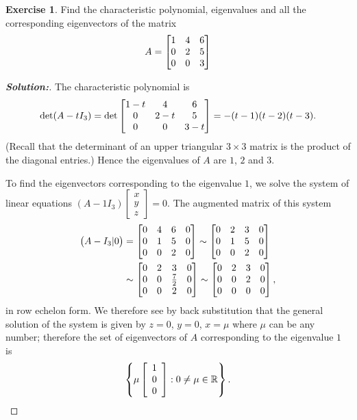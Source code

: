 \documentclass[a4paper]{amsart}
\theoremstyle{definition}
\newtheorem{exercise}{Exercise}
\newenvironment{solution}{\begin{proof}[\textbf{Solution:}] \vphantom{u}}{\end{proof}}
\begin{document}
\begin{exercise}\label{ex-evectors-i}
 Find the characteristic polynomial, eigenvalues and all the corresponding
 eigenvectors of the matrix
 \[ A = \left[\begin{matrix} 1 & 4 & 6 \\ 0 & 2 & 5 \\ 0 & 0 & 3 \end{matrix}\right] \]
\end{exercise}
\begin{solution}
 The characteristic polynomial is
    $$ \det (A - tI_3) =
    \det \left[\begin{matrix}
    1-t & 4 & 6 \\
    0 & 2-t & 5 \\
    0 & 0 & 3-t
    \end{matrix}\right]=-(t-1)(t-2)(t-3).
    $$
 (Recall that the determinant of an upper triangular $3 \times 3$
 matrix is the product of the diagonal entries.) Hence the
 eigenvalues of $A$ are $1$, $2$ and $3$.

 To find the eigenvectors corresponding to the eigenvalue $1$, we
 solve the system of linear equations $(A - 1I_3)\left[
 \begin{array}{c}x \\ y\\z
 \end{array} \right] = 0$. The augmented matrix of this system
 \begin{align*}
 \big(A - I_3|0\big) & = \left[\begin{matrix} 0& 4&
 6&0\\0&1&5&0\\0&0&2&0\end{matrix}\right] \sim \left[\begin{matrix} 0& 2&
 3&0\\0&1&5&0\\0&0&2&0\end{matrix}\right]\\& \sim \left[\begin{matrix} 0& 2&
 3&0\\0&0&\frac{7}{2}&0\\0&0&2&0\end{matrix}\right] \sim \left[\begin{matrix}
 0& 2& 3&0\\0&0&2&0\\0&0&0&0\end{matrix}\right],
 \end{align*}
 in row echelon form. We therefore see by back substitution that
 the general solution of the system is given by $z = 0$, $y = 0$,
 $x = \mu$ where $\mu$ can be any number; therefore the set of
 eigenvectors of $A$ corresponding to the eigenvalue $1$ is
 $$
 \left\{ \mu \left[ \begin{array}{c} 1\\0\\0
 \end{array} \right] : 0 \neq \mu \in {\mathbb{R}} \right\}.
 $$


\end{solution}
\end{document}
